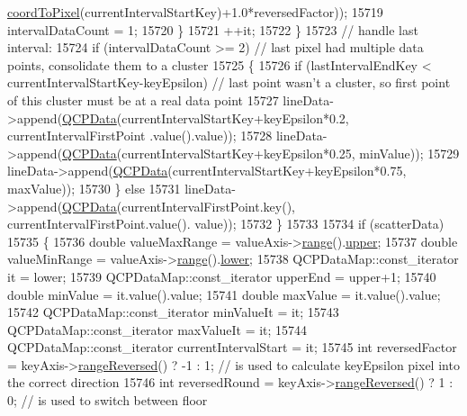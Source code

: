\begin{DoxyCode}
      \hyperlink{class_q_c_p_axis_a985ae693b842fb0422b4390fe36d299a}{coordToPixel}(currentIntervalStartKey)+1.0*reversedFactor));
15719           intervalDataCount = 1;
15720         \}
15721         ++it;
15722       \}
15723       \textcolor{comment}{// handle last interval:}
15724       \textcolor{keywordflow}{if} (intervalDataCount >= 2) \textcolor{comment}{// last pixel had multiple data points, consolidate them to a cluster}
15725       \{
15726         \textcolor{keywordflow}{if} (lastIntervalEndKey < currentIntervalStartKey-keyEpsilon) \textcolor{comment}{// last point wasn't a cluster, so
       first point of this cluster must be at a real data point}
15727           lineData->append(\hyperlink{class_q_c_p_data}{QCPData}(currentIntervalStartKey+keyEpsilon*0.2, currentIntervalFirstPoint
      .value().value));
15728         lineData->append(\hyperlink{class_q_c_p_data}{QCPData}(currentIntervalStartKey+keyEpsilon*0.25, minValue));
15729         lineData->append(\hyperlink{class_q_c_p_data}{QCPData}(currentIntervalStartKey+keyEpsilon*0.75, maxValue));
15730       \} \textcolor{keywordflow}{else}
15731         lineData->append(\hyperlink{class_q_c_p_data}{QCPData}(currentIntervalFirstPoint.key(), currentIntervalFirstPoint.value().
      value));
15732     \}
15733     
15734     \textcolor{keywordflow}{if} (scatterData)
15735     \{
15736       \textcolor{keywordtype}{double} valueMaxRange = valueAxis->\hyperlink{class_q_c_p_axis_ab1ea79a4f5ea4cf42620f8f51c477ac4}{range}().\hyperlink{class_q_c_p_range_ae44eb3aafe1d0e2ed34b499b6d2e074f}{upper};
15737       \textcolor{keywordtype}{double} valueMinRange = valueAxis->\hyperlink{class_q_c_p_axis_ab1ea79a4f5ea4cf42620f8f51c477ac4}{range}().\hyperlink{class_q_c_p_range_aa3aca3edb14f7ca0c85d912647b91745}{lower};
15738       QCPDataMap::const\_iterator it = lower;
15739       QCPDataMap::const\_iterator upperEnd = upper+1;
15740       \textcolor{keywordtype}{double} minValue = it.value().value;
15741       \textcolor{keywordtype}{double} maxValue = it.value().value;
15742       QCPDataMap::const\_iterator minValueIt = it;
15743       QCPDataMap::const\_iterator maxValueIt = it;
15744       QCPDataMap::const\_iterator currentIntervalStart = it;
15745       \textcolor{keywordtype}{int} reversedFactor = keyAxis->\hyperlink{class_q_c_p_axis_ade26dc7994ccd8a11f64fd83377ee021}{rangeReversed}() ? -1 : 1; \textcolor{comment}{// is used to calculate
       keyEpsilon pixel into the correct direction}
15746       \textcolor{keywordtype}{int} reversedRound = keyAxis->\hyperlink{class_q_c_p_axis_ade26dc7994ccd8a11f64fd83377ee021}{rangeReversed}() ? 1 : 0; \textcolor{comment}{// is used to switch between floor
}
\end{DoxyCode}
